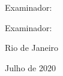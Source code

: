 Examinador:
      \vspace{0.5cm}
      \begin{flushright}
         \parbox{10cm}{
            \hrulefill

            \vspace{-.375cm}

            \vspace{0.1cm}
         }
      \end{flushright}

Examinador:
      \vspace{0.5cm}
      \begin{flushright}
         \parbox{10cm}{
            \hrulefill

            \vspace{-.375cm}

            \vspace{0.1cm}
         }
      \end{flushright}


      \vfill


\begin{center}
Rio de Janeiro

Julho de 2020
\end{center}
